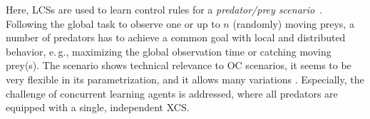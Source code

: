 Here, LCSs are used to learn control rules for a \emph{predator/prey scenario}~\cite{BJD86}. Following the global task to observe one or up to $n$ (randomly) moving preys, a number of predators has to achieve a common goal with local and distributed behavior, e.\,g., maximizing the global observation time or catching moving prey(s). The scenario shows technical relevance to OC scenarios, it seems to be very flexible in its parametrization, and it allows many variations \cite{SV00}. %
Especially, the challenge of concurrent learning agents is addressed, where all predators are equipped with a single, independent XCS.



